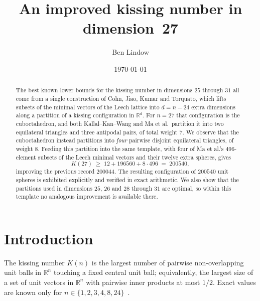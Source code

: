 \documentclass[11pt,reqno]{amsart}
\theoremstyle{plain}
\theoremstyle{remark}
\newcommand{\R}{\mathbb{R}}
\begin{document}
\title[An improved kissing number in dimension 27]
      {An improved kissing number in dimension~27}

\author{Ben Lindow}
\date{\today}


\begin{abstract}
The best known lower bounds for the kissing number in dimensions $25$ through
$31$ all come from a single construction of Cohn, Jiao, Kumar and Torquato,
which lifts subsets of the minimal vectors of the Leech lattice into $d = n-24$
extra dimensions along a partition of a kissing configuration in $\R^{d}$.  For
$n = 27$ that configuration is the cuboctahedron, and both Kallal--Kan--Wang and
Ma et al.\ partition it into two equilateral triangles and three antipodal
pairs, of total weight $7$.  We observe that the cuboctahedron instead
partitions into \emph{four} pairwise disjoint equilateral triangles, of weight
$8$.  Feeding this partition into the same template, with four of Ma et al.'s
$496$-element subsets of the Leech minimal vectors and their twelve extra
spheres, gives
\[
  K(27) \;\ge\; 12 + 196560 + 8\cdot 496 \;=\; 200540,
\]
improving the previous record $200044$.  The resulting configuration of $200540$
unit spheres is exhibited explicitly and verified in exact arithmetic.  We also
show that the partitions used in dimensions $25$, $26$ and $28$ through $31$ are
optimal, so within this template no analogous improvement is available there.
\end{abstract}

\maketitle

\section{Introduction}

The kissing number $K(n)$ is the largest number of pairwise non-overlapping unit
balls in $\R^{n}$ touching a fixed central unit ball; equivalently, the largest
size of a set of unit vectors in $\R^{n}$ with pairwise inner products at most
$1/2$.  Exact values are known only for $n \in \{1,2,3,4,8,24\}$~\cite{SvdW1953,
Musin2008}.
\end{document}
